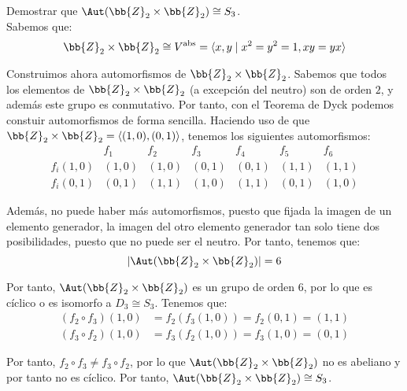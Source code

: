 \begin{ejercicio}
    Demostrar que $\Aut(\bb{Z}_2\times \bb{Z}_2)\cong S_3$.\\

    Sabemos que:
    \begin{equation*}
        \bb{Z}_2\times \bb{Z}_2 \cong V^{\text{abs}} = \langle x,y\mid x^2=y^2=1,xy=yx\rangle
    \end{equation*}

    Construimos ahora automorfismos de $\bb{Z}_2\times \bb{Z}_2$. Sabemos que todos los elementos de $\bb{Z}_2\times \bb{Z}_2$ (a excepción del neutro) son de orden $2$, y además este grupo es conmutativo. Por tanto, con el Teorema de Dyck podemos constuir automorfismos de forma sencilla. Haciendo uso de que $\bb{Z}_2\times \bb{Z}_2=\langle(1,0),(0,1)\rangle$, tenemos los siguientes automorfismos:
    \begin{equation*}
        \begin{array}{c||c|c|c|c|c|c}
            & f_1 & f_2 & f_3 & f_4 & f_5 & f_6\\ \hline
            f_i(1,0) & (1,0) & (1,0) & (0,1) & (0,1) & (1,1) & (1,1)\\
            f_i(0,1) & (0,1) & (1,1) & (1,0) & (1,1) & (0,1) & (1,0)
        \end{array}
    \end{equation*}
    
    
    
    Además, no puede haber más automorfismos, puesto que fijada la imagen de un elemento generador, la imagen del otro elemento generador tan solo tiene dos posibilidades, puesto que no puede ser el neutro. Por tanto, tenemos que:
    \begin{equation*}
        |\Aut(\bb{Z}_2\times \bb{Z}_2)| = 6
    \end{equation*}

    Por tanto, $\Aut(\bb{Z}_2\times \bb{Z}_2)$ es un grupo de orden $6$, por lo que es cíclico o es isomorfo a $D_3\cong S_3$. Tenemos que:
    \begin{align*}
        (f_2\circ f_3)(1,0) &= f_2(f_3(1,0)) = f_2(0,1) = (1,1)\\
        (f_3\circ f_2)(1,0) &= f_3(f_2(1,0)) = f_3(1,0) = (0,1)
    \end{align*}

    Por tanto, $f_2\circ f_3\neq f_3\circ f_2$, por lo que $\Aut(\bb{Z}_2\times \bb{Z}_2)$ no es abeliano y por tanto no es cíclico. Por tanto, $\Aut(\bb{Z}_2\times \bb{Z}_2)\cong S_3$.
\end{ejercicio}

